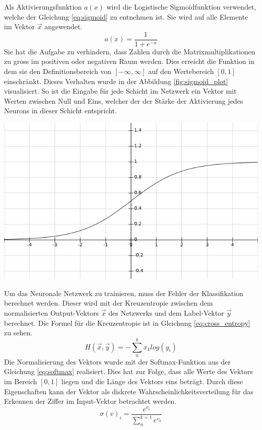 \documentclass[Interploate_hadwritten_Digits.tex]{subfiles}
\begin{document}
	Als Aktivierungsfunktion $ a(x) $ wird die Logistische Sigmoidfunktion verwendet, welche der Gleichung \ref{eq:sigmoid} zu entnehmen ist. Sie wird auf alle Elemente im Vektor $ \vec{x} $ angewendet. 
	\begin{equation}
	a(x)=\frac{1}{1+e^{-x}}
	\label{eq:sigmoid}
	\end{equation}
	Sie hat die Aufgabe zu verhindern, dass Zahlen durch die Matrixmultiplikationen zu gross im positiven oder negativen Raum werden. Dies erreicht die Funktion in dem sie den Definitionsbereich von $ [-\infty, \infty] $ auf den Wertebereich $ [0, 1] $ einschränkt. Dieses Verhalten wurde in der Abbildung \ref{fig:sigmoid_plot} visualisiert. So ist die Eingabe für jede Schicht im Netzwerk ein Vektor mit Werten zwischen Null und Eins, welcher der der Stärke der Aktivierung jedes Neurons in dieser Schicht entspricht.
	\begin{Figure}
		\centering
		\includegraphics[width=\linewidth]{img/sigmoid_plot.png}
		\label{fig:sigmoid_plot}
	\end{Figure}

	Um das Neuronale Netzwerk zu trainieren, muss der Fehler der Klassifikation berechnet werden. Dieser wird mit der Kreuzentropie zwischen dem normalisierten Output-Vektors $ \vec{x} $ des Netzwerks und dem Label-Vektor $ \vec{y} $ berechnet. Die Formel für die Kreuzentropie ist in Gleichung \ref{eq:cross_entropy} zu sehen.
	\begin{equation}
	H(\vec{x}, \vec{y}) = -\sum_{n}^{k}x_{k}log(y_{i})
	\label{eq:cross_entropy}
	\end{equation}
	Die Normalisierung des Vektors wurde mit der Softmax-Funktion aus der Gleichung \ref{eq:softmax}  realisiert. Dies hat zur Folge, dass alle Werte des Vektors im Bereich $ [0, 1] $ liegen und die Länge des Vektors eins beträgt. Durch diese Eigenschaften kann der Vektor als diskrete Wahrscheinlichkeitsverteilung für das Erkennen der Ziffer im Input-Vektor betrachtet werden.
	\begin{equation}
	\sigma(v)_{i} = \frac{e^{v_{i}}}{\sum_{n}^{k=1}e^{v_{k}}}
	\label{eq:softmax}
	\end{equation}
	
\end{document}
